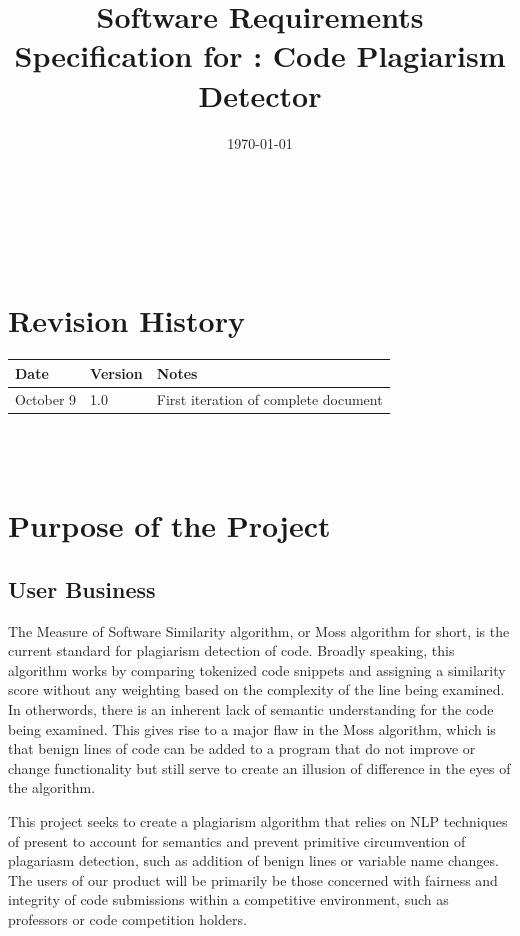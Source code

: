 \documentclass[12pt]{article}
\begin{document}
\title{Software Requirements Specification for \progname: Code Plagiarism Detector} 
\author{\authname}
\date{\today}
	
\maketitle

~\newpage


\tableofcontents

~\newpage

\section*{Revision History}

\begin{tabularx}{\textwidth}{p{3cm}p{2cm}X}
\toprule {\textbf{Date}} & {\textbf{Version}} & {\textbf{Notes}}\\
\midrule
October 9 & 1.0 & First iteration of complete document\\
\bottomrule
\end{tabularx}

~\\

~\newpage
\section{Purpose of the Project}
\subsection{User Business}

The Measure of Software Similarity algorithm, or Moss algorithm for short, is
the current standard for plagiarism detection of code. Broadly speaking, this
algorithm works by comparing tokenized code snippets and assigning a similarity
score without any weighting based on the complexity of the line being examined.
In otherwords, there is an inherent lack of semantic understanding for the code
being examined. This gives rise to a major flaw in the Moss algorithm, which is
that benign lines of code can be added to a program that do not improve or
change functionality but still serve to create an illusion of difference in the
eyes of the algorithm. 

This project seeks to create a plagiarism algorithm that relies on NLP 
techniques of present to account for semantics and prevent primitive 
circumvention of plagariasm detection, such as addition of benign lines or 
variable name changes. The users of our product will be primarily be those 
concerned with fairness and integrity of code submissions within a competitive 
environment, such as professors or code competition holders. 
\end{document}
